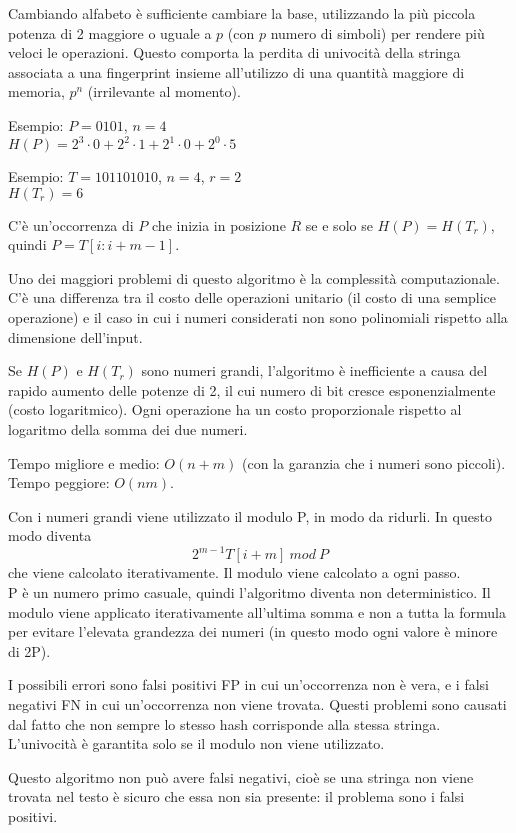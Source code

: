 Cambiando alfabeto è sufficiente cambiare la base, utilizzando la più piccola potenza di 2 maggiore o uguale a $p$ (con $p$ numero di simboli) per rendere più veloci le operazioni. Questo comporta la perdita di univocità della stringa associata a una fingerprint insieme all'utilizzo di una quantità maggiore di memoria, $p^n$ (irrilevante al momento). 

Esempio: $P = 0101$, $n = 4$ \\
$H(P) = 2^3 \cdot 0 + 2^2 \cdot 1 + 2^1 \cdot 0 + 2^0 \cdot 5$

Esempio: $T = 101101010$, $n = 4$, $r = 2$ \\
$H(T_r) = 6$

C'è un'occorrenza di $P$ che inizia in posizione $R$ se e solo se $H(P) = H(T_r)$, quindi $P = T[i : i + m - 1]$. 

Uno dei maggiori problemi di questo algoritmo è la complessità computazionale. C'è una differenza tra il costo delle operazioni unitario (il costo di una semplice operazione) e il caso in cui i numeri considerati non sono polinomiali rispetto alla dimensione dell'input. 

Se $H(P)$ e $H(T_r)$ sono numeri grandi, l'algoritmo è inefficiente a causa del rapido aumento delle potenze di 2, il cui numero di bit cresce esponenzialmente (costo logaritmico). Ogni operazione ha un costo proporzionale rispetto al logaritmo della somma dei due numeri.

Tempo migliore e medio: $O(n + m)$ (con la garanzia che i numeri sono piccoli). \\
Tempo peggiore: $O(nm)$.

Con i numeri grandi viene utilizzato il modulo P, in modo da ridurli. In questo modo diventa
$$2^{m-1}T[i + m]\ mod\ P$$
che viene calcolato iterativamente. Il modulo viene calcolato a ogni passo. \\
P è un numero primo casuale, quindi l'algoritmo diventa non deterministico. Il modulo viene applicato iterativamente all'ultima somma e non a tutta la formula per evitare l'elevata grandezza dei numeri (in questo modo ogni valore è minore di 2P). 

I possibili errori sono falsi positivi FP in cui un'occorrenza non è vera, e i falsi negativi FN in cui un'occorrenza non viene trovata. Questi problemi sono causati dal fatto che non sempre lo stesso hash corrisponde alla stessa stringa. L'univocità è garantita solo se il modulo non viene utilizzato. 

Questo algoritmo non può avere falsi negativi, cioè se una stringa non viene trovata nel testo è sicuro che essa non sia presente: il problema sono i falsi positivi. 

